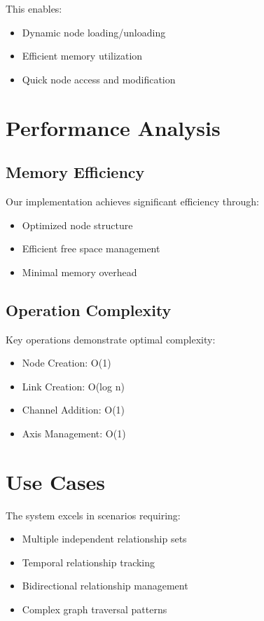 This enables:
\begin{itemize}
    \item Dynamic node loading/unloading
    \item Efficient memory utilization
    \item Quick node access and modification
\end{itemize}

\section{Performance Analysis}\label{Sec:Performance}
\subsection{Memory Efficiency}
Our implementation achieves significant efficiency through:
\begin{itemize}
    \item Optimized node structure
    \item Efficient free space management
    \item Minimal memory overhead
\end{itemize}

\subsection{Operation Complexity}
Key operations demonstrate optimal complexity:
\begin{itemize}
    \item Node Creation: O(1)
    \item Link Creation: O(log n)
    \item Channel Addition: O(1)
    \item Axis Management: O(1)
\end{itemize}

\section{Use Cases}\label{Sec:UseCases}
The system excels in scenarios requiring:
\begin{itemize}
    \item Multiple independent relationship sets
    \item Temporal relationship tracking
    \item Bidirectional relationship management
    \item Complex graph traversal patterns
\end{itemize}

